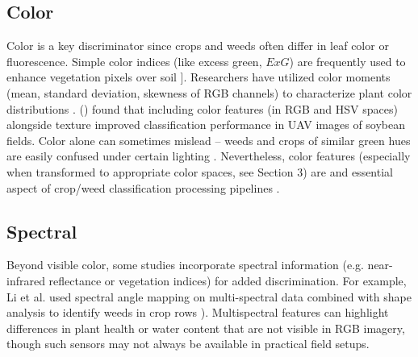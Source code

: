 \documentclass[letterpaper, notitlepage]{report}
\begin{document}
\subsection{Color}
	 Color is a key discriminator since crops and weeds often differ in leaf color or fluorescence. Simple color indices (like excess green, $ExG$) are frequently used to enhance vegetation pixels over soil ]. Researchers have utilized color moments (mean, standard deviation, skewness of RGB channels) to characterize plant color distributions \parencite{Wu2021-gt}.  \citeauthor{Mekhalfa2021-np} (\citeyear{Mekhalfa2021-np}) found that including color features (in RGB and HSV spaces) alongside texture improved classification performance in UAV images of soybean fields. Color alone can sometimes mislead – weeds and crops of similar green hues are easily confused under certain lighting \parencite{Wu2021-gt}. Nevertheless, color features (especially when transformed to appropriate color spaces, see Section 3) are and essential aspect of crop/weed classification processing pipelines \parencite{Sabzi2020-af}. 
\subsection{Spectral}
	Beyond visible color, some studies incorporate spectral information (e.g. near-infrared reflectance or vegetation indices) for added discrimination. For example, Li et al. used spectral angle mapping on multi-spectral data combined with shape analysis to identify weeds in crop rows \parencite{Wu2021-gt}). Multispectral features can highlight differences in plant health or water content that are not visible in RGB imagery, though such sensors may not always be available in practical field setups.  
\end{document}
